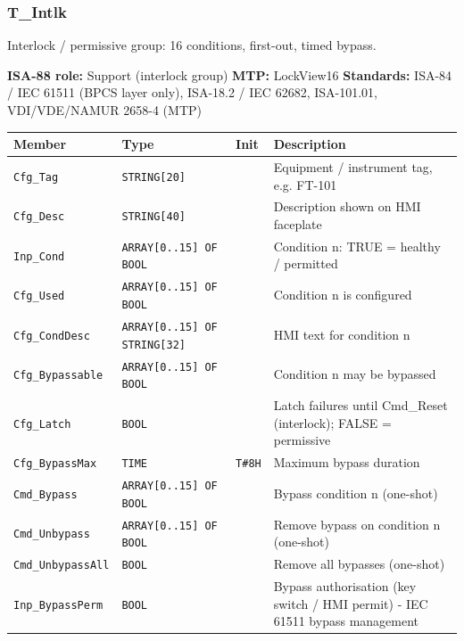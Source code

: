 \subsubsection*{T\_Intlk}
\label{app:pclib:tintlk}
Interlock /\allowbreak{} permissive group: 16 conditions, first-out, timed bypass.

{\small\textbf{ISA-88 role:} Support (interlock group) \quad \textbf{MTP:} LockView16 \quad \textbf{Standards:} ISA-84 /\allowbreak{} IEC 61511 (BPCS layer only), ISA-18.2 /\allowbreak{} IEC 62682, ISA-101.01, VDI/\allowbreak{}VDE/\allowbreak{}NAMUR 2658-4 (MTP)}
{\footnotesize
\begin{longtable}{@{}>{\raggedright\arraybackslash}p{3.4cm}>{\raggedright\arraybackslash}p{3.3cm}>{\raggedright\arraybackslash}p{1.3cm}>{\raggedright\arraybackslash}p{6.4cm}@{}}
\toprule
\rowcolor{tblhead}\textbf{Member} & \textbf{Type} & \textbf{Init} & \textbf{Description} \\
\midrule
\endhead
\texttt{Cfg\_Tag} & \texttt{STRING[20]} &  & Equipment /\allowbreak{} instrument tag, e.g. FT-101 \\
\texttt{Cfg\_Desc} & \texttt{STRING[40]} &  & Description shown on HMI faceplate \\
\texttt{Inp\_Cond} & \texttt{ARRAY[0..15] OF BOOL} &  & Condition n: TRUE = healthy /\allowbreak{} permitted \\
\texttt{Cfg\_Used} & \texttt{ARRAY[0..15] OF BOOL} &  & Condition n is configured \\
\texttt{Cfg\_CondDesc} & \texttt{ARRAY[0..15] OF STRING[32]} &  & HMI text for condition n \\
\texttt{Cfg\_Bypassable} & \texttt{ARRAY[0..15] OF BOOL} &  & Condition n may be bypassed \\
\texttt{Cfg\_Latch} & \texttt{BOOL} &  & Latch failures until Cmd\_Reset (interlock); FALSE = permissive \\
\texttt{Cfg\_BypassMax} & \texttt{TIME} & \texttt{T\#8H} & Maximum bypass duration \\
\texttt{Cmd\_Bypass} & \texttt{ARRAY[0..15] OF BOOL} &  & Bypass condition n (one-shot) \\
\texttt{Cmd\_Unbypass} & \texttt{ARRAY[0..15] OF BOOL} &  & Remove bypass on condition n (one-shot) \\
\texttt{Cmd\_UnbypassAll} & \texttt{BOOL} &  & Remove all bypasses (one-shot) \\
\texttt{Inp\_BypassPerm} & \texttt{BOOL} &  & Bypass authorisation (key switch /\allowbreak{} HMI permit) - IEC 61511 bypass management \\

\end{longtable}}
